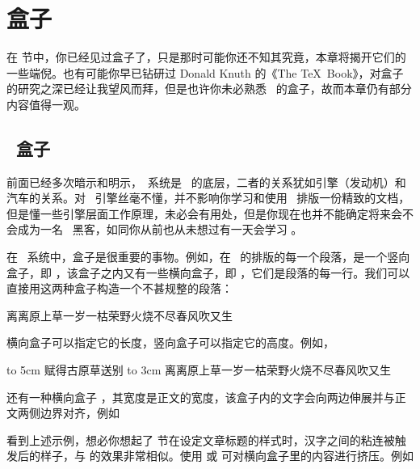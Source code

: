 \chapter{盒子}

在  节中，你已经见过盒子了，只是那时可能你还不知其究竟，本章将揭开它们的一些端倪。也有可能你早已钻研过 Donald Knuth 的《The \TeX\ Book》，对盒子的研究之深已经让我望风而拜，但是也许你未必熟悉 \CONTEXT\ 的盒子，故而本章仍有部分内容值得一观。

\section{\TEX\ 盒子}

前面已经多次暗示和明示，\TEX\ 系统是 \CONTEXT\ 的底层，二者的关系犹如引擎（发动机）和汽车的关系。对 \TEX\ 引擎丝毫不懂，并不影响你学习和使用 \CONTEXT\ 排版一份精致的文档，但是懂一些引擎层面工作原理，未必会有用处，但是你现在也并不能确定将来会不会成为一名 \TEX\ 黑客，如同你从前也从未想过有一天会学习 \CONTEXT。

在 \TEX\ 系统中，盒子是很重要的事物。例如，在 \CONTEXT\ 的排版的每一个段落，是一个竖向盒子，即 \type{\vbox}，该盒子之内又有一些横向盒子，即 \type{\hbox}，它们是段落的每一行。我们可以直接用这两种盒子构造一个不甚规整的段落：

\startexample
\vbox{
  \hbox{离离原上草}\hbox{一岁一枯荣}\hbox{野火烧不尽}\hbox{春风吹又生}
}
\stopexample
{}

横向盒子可以指定它的长度，竖向盒子可以指定它的高度。例如，

\starttyping[option=TEX]
\hbox to 5cm {赋得古原草送别}
\vbox to 3cm {
  \hbox{离离原上草}\hbox{一岁一枯荣}\hbox{野火烧不尽}\hbox{春风吹又生}
}
\stoptyping

还有一种横向盒子 \type{\line}，其宽度是正文的宽度，该盒子内的文字会向两边伸展并与正文两侧边界对齐，例如

\starttyping[option=TEX]
\stoptyping
{}

看到上述示例，想必你想起了 \in[essay] 节在设定文章标题的样式时，汉字之间的粘连被触发后的样子，与\type{\line} 的效果非常相似。使用 \type{\hfill} 或 \type{\hss} 可对横向盒子里的内容进行挤压。例如

\starttyping[option=TEX]
\stoptyping

